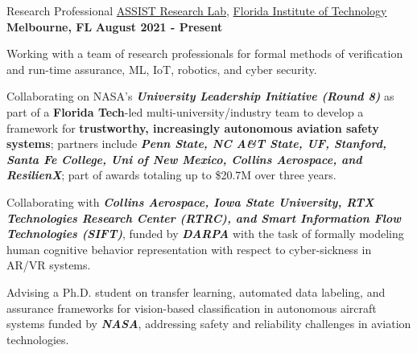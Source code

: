 


\begin{cventries}

\cventry
{Research Professional}
{\href{https://research.fit.edu/assist-lab/}{ASSIST Research Lab}, \href{www.fit.edu}{Florida Institute of Technology}}
{\textbf{Melbourne, FL}}
{\textbf{August 2021 - Present}}
{
\begin{cvitems}
\item Working with a team of research professionals for formal methods of verification and run-time assurance, ML, IoT, robotics, and cyber security.
\item Collaborating on NASA’s \textit{\textbf{University Leadership Initiative (Round 8)}} as part of a \textbf{Florida Tech}-led multi-university/industry team to develop a framework for \textbf{trustworthy, increasingly autonomous aviation safety systems}; partners include \textit{\textbf{Penn State, NC A\&T State, UF, Stanford, Santa Fe College, Uni of New Mexico, Collins Aerospace, and ResilienX}}; part of awards totaling up to \$20.7M over three years.
\item Collaborating with \textit{\textbf{Collins Aerospace, Iowa State University, RTX Technologies Research Center (RTRC), and Smart Information Flow Technologies (SIFT)}}, funded by \textit{\textbf{DARPA}} with the task of formally modeling human cognitive behavior representation with respect to cyber-sickness in AR/VR systems. 
\item Advising a Ph.D. student on transfer learning, automated data labeling, and assurance frameworks for vision-based classification in autonomous aircraft systems funded by \textit{\textbf{NASA}}, addressing safety and reliability challenges in aviation technologies.

\end{cvitems}}
\end{cventries}
